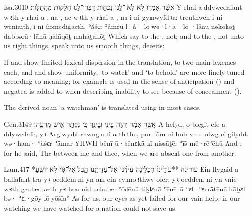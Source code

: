 \begin{example}{Isa.}{30}{10}{}{}
	\quoling
	{אֲשֶׁ֨ר אָמְר֤וּ  לֹ֣א   לֹ֥א ־לָ֖נוּ נְכֹח֑וֹת דַּבְּרוּ־לָ֣נוּ חֲלָק֔וֹת  מַהֲתַלּֽוֹת׃}
	{Y rhai a ddywedaſant wꝛth y rhai a , na , ac wꝛth y rhai a , na  i ni gymwyſdꝛa: treuthwch i ni weniaith,  i ni ſiomedigaeth.}
	{ʾăšɛr ʾå̄mrū l·å̄· lō  wə·l·a· lō ·lå̄nū nəḵōḥōṯ dabbərū·lå̄nū ḥălå̄qōṯ  mahăṯallōṯ}
	{Which say to the ,  not; and to the ,  not unto us right things, speak unto us smooth things,  deceits:}
\end{example}




\begin{paper}
	{\click} If  and  show limited lexical dispersion in the translation, to two main lexemes each, and  and  show uniformity,  ‘to watch’ and  ‘to behold’ are more finely tuned according to meaning; for example  is used in the sense of anticipation () and negated  is added to  when describing inability to see because of concealment ().

	The derived noun  ‘a watchman’ is translated using  in most cases.
\end{paper}

\begin{example}{Gen.}{31}{49}{}{}
	\quoling
	{ אֲשֶׁ֣ר אָמַ֔ר  יְהוָ֖ה בֵּינִ֣י וּבֵינֶ֑ךָ כִּ֥י נִסָּתֵ֖ר אִ֥ישׁ מֵרֵעֵֽהוּ׃}
	{A  hefyd, o blegit efe a ddywedaſe,  yꝛ Arglwydd rhwng o fi a thithe, pan fôm ni bob vn o olwg ei gilydd.}
	{wə·ham· ʾăšɛr ʾå̄mar  YHWH bēnī ū·ḇēnɛḵå̄ kī nisså̄ṯēr ʾīš mē·rēʿēhū}
	{And ; for he said, The {\LORD}  between me and thee, when we are absent one from another.}
\end{example}

\begin{example}{Lam.}{4}{17}{}{}
	\quoling
	{*עודינה **עוֹדֵ֙ינוּ֙ תִּכְלֶ֣ינָה עֵינֵ֔ינוּ אֶל־עֶזְרָתֵ֖נוּ הָ֑בֶל   אֶל־גּ֖וֹי לֹ֥א יוֹשִֽׁעַ׃}
	{Ein llygaid a ballaſant tra yꝛ oeddem ni yn  am ein cynnoꝛthwy ofer:  yꝛ oeddem ni yn vnic wꝛth genhedlaeth yꝛ hon nid achube.}
	{ʿōḏēnū tiḵlɛnå̄ ʿēnēnū ʾɛl·ʿɛzrå̄ṯēnū hå̄ḇɛl bə·  ʾɛl·gōy lō yōšīaʿ}
	{As for us, our eyes as yet failed for our vain help: in our watching we have watched for a nation  could not save us.}
\end{example}

